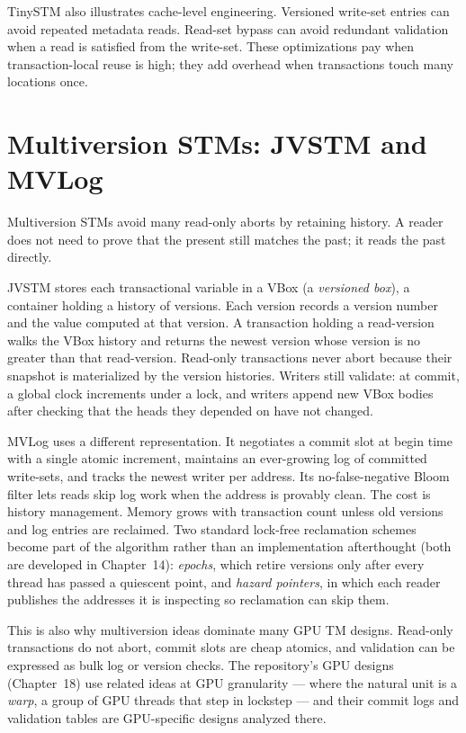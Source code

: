 TinySTM also illustrates cache-level engineering. Versioned write-set entries can avoid repeated metadata reads. Read-set bypass can avoid redundant validation when a read is satisfied from the write-set. These optimizations pay when transaction-local reuse is high; they add overhead when transactions touch many locations once.

\section{Multiversion STMs: JVSTM and MVLog}

Multiversion STMs avoid many read-only aborts by retaining history. A reader does not need to prove that the present still matches the past; it reads the past directly.

JVSTM stores each transactional variable in a VBox (a \emph{versioned box}), a container holding a history of versions. Each version records a version number and the value computed at that version. A transaction holding a read-version walks the VBox history and returns the newest version whose version is no greater than that read-version. Read-only transactions never abort because their snapshot is materialized by the version histories. Writers still validate: at commit, a global clock increments under a lock, and writers append new VBox bodies after checking that the heads they depended on have not changed.

MVLog uses a different representation. It negotiates a commit slot at begin time with a single atomic increment, maintains an ever-growing log of committed write-sets, and tracks the newest writer per address. Its no-false-negative Bloom filter lets reads skip log work when the address is provably clean. The cost is history management. Memory grows with transaction count unless old versions and log entries are reclaimed. Two standard lock-free reclamation schemes become part of the algorithm rather than an implementation afterthought (both are developed in Chapter~14): \emph{epochs}, which retire versions only after every thread has passed a quiescent point, and \emph{hazard pointers}, in which each reader publishes the addresses it is inspecting so reclamation can skip them.

This is also why multiversion ideas dominate many GPU TM designs. Read-only transactions do not abort, commit slots are cheap atomics, and validation can be expressed as bulk log or version checks. The repository's GPU designs (Chapter~18) use related ideas at GPU granularity --- where the natural unit is a \emph{warp}, a group of GPU threads that step in lockstep --- and their commit logs and validation tables are GPU-specific designs analyzed there.

